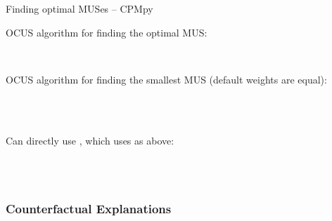 \documentclass{cons-beamer}
\begin{document}
\begin{flashcardcpmpy}
\begin{frame}{Finding optimal MUSes -- CPMpy}

  OCUS algorithm for finding the optimal MUS:
  \begin{example}
    \\
  \end{example}
  \vfill

  OCUS algorithm for finding the smallest MUS (default weights are equal):
  \begin{example}
    \\
    \\
  \end{example}    
  \vfill

  Can directly use , which uses  as above: 
  \begin{example}        
    \\
    \\
  \end{example}    
\end{frame}
\end{flashcardcpmpy}


\subsubsection{Counterfactual Explanations}
\end{document}
